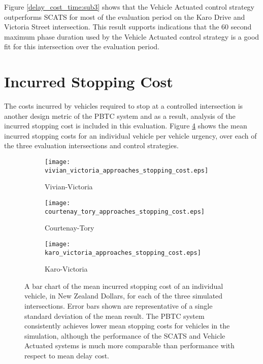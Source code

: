 Figure \ref{delay_cost_time:sub3} shows that the Vehicle Actuated control strategy outperforms SCATS for most of the evaluation period on the Karo Drive and Victoria Street intersection. This result supports indications that the 60 second maximum phase duration used by the Vehicle Actuated control strategy is a good fit for this intersection over the evaluation period.

\section{Incurred Stopping Cost}
\label{sec:incurred_stopping_cost}

The costs incurred by vehicles required to stop at a controlled intersection is another design metric of the PBTC system and as a result, analysis of the incurred stopping cost is included in this evaluation. Figure \ref{eval:mean_stopping_cost} shows the mean incurred stopping costs for an individual vehicle per vehicle urgency, over each of the three evaluation intersections and control strategies. 

\begin{figure}
\centering
\begin{subfigure}{.5\textwidth}
  \centering
  \texttt{[image: vivian\_victoria\_approaches\_stopping\_cost.eps]}
  \caption{Vivian-Victoria}
  \label{mean_stopping_cost:sub1}
\end{subfigure}%
\begin{subfigure}{.5\textwidth}
  \centering
  \texttt{[image: courtenay\_tory\_approaches\_stopping\_cost.eps]}
  \caption{Courtenay-Tory}
  \label{mean_stopping_cost:sub2}
\end{subfigure}

\vspace{1cm}

\begin{subfigure}{.5\textwidth}
  \centering
  \texttt{[image: karo\_victoria\_approaches\_stopping\_cost.eps]}
  \caption{Karo-Victoria}
  \label{mean_stopping_cost:sub3}
\end{subfigure}%
\caption[Results of measuring the mean stopping cost incurred by individual vehicles for each evaluation control strategy and intersection.]{ A bar chart of the mean incurred stopping cost of an individual vehicle, in New Zealand Dollars, for each of the three simulated intersections. Error bars shown are representative of a single standard deviation of the mean result. The PBTC system consistently achieves lower mean stopping costs for vehicles in the simulation, although the performance of the SCATS and Vehicle Actuated systems is much more comparable than performance with respect to mean delay cost.   }
\label{eval:mean_stopping_cost}
\end{figure}

